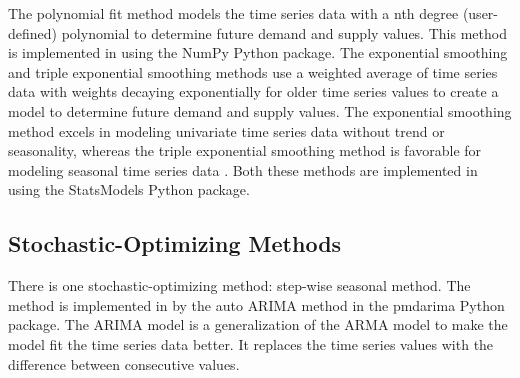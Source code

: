 The polynomial fit method models the time series data 
with a nth degree (user-defined) polynomial to determine 
future demand and supply values. 
This method is implemented in \deploy using the 
NumPy \cite{developers_numpy_2013} Python package. 
The exponential smoothing and triple exponential smoothing 
methods use a weighted average 
of time series data with weights decaying exponentially 
for older time series values \cite{hyndman_forecasting:_2018}
to create a model to determine future demand and supply values. 
The exponential smoothing method excels in 
modeling univariate time series data without trend or seasonality, 
whereas the triple exponential smoothing method is favorable for 
modeling seasonal time series data \cite{flanagan_methods_2019}. 
Both these methods are implemented in \deploy 
using the StatsModels \cite{github_community_statsmodels:_2019}
Python package. 

\subsection{Stochastic-Optimizing Methods}
There is one stochastic-optimizing method: step-wise 
seasonal method. 
The method is implemented in \deploy by the auto \gls{ARIMA} 
method in the pmdarima \cite{noauthor_pmdarima:_2019}
Python package. 
The \gls{ARIMA} model is a generalization of the \gls{ARMA}
model to make the model fit the time series data better. 
It replaces the time series values with the difference
between consecutive values. 


